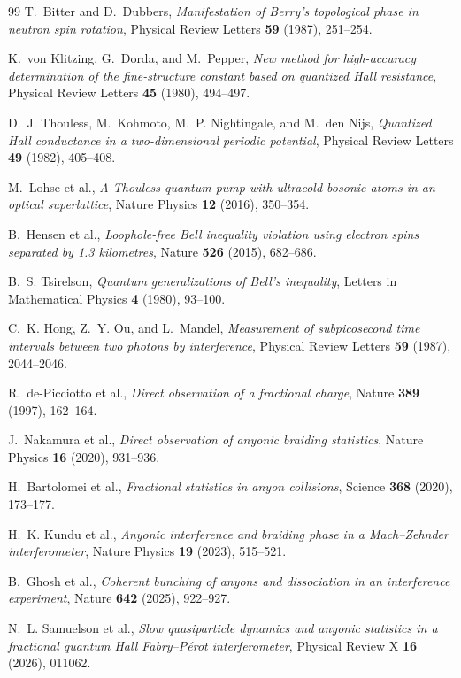 \begin{thebibliography}{99}
T.~Bitter and D.~Dubbers,
\emph{Manifestation of Berry's topological phase in neutron spin rotation},
Physical Review Letters \textbf{59} (1987), 251--254.

K.~von Klitzing, G.~Dorda, and M.~Pepper,
\emph{New method for high-accuracy determination of the fine-structure
constant based on quantized Hall resistance},
Physical Review Letters \textbf{45} (1980), 494--497.

D.~J. Thouless, M.~Kohmoto, M.~P. Nightingale, and M.~den Nijs,
\emph{Quantized Hall conductance in a two-dimensional periodic potential},
Physical Review Letters \textbf{49} (1982), 405--408.

M.~Lohse et al.,
\emph{A Thouless quantum pump with ultracold bosonic atoms in an optical
superlattice},
Nature Physics \textbf{12} (2016), 350--354.

B.~Hensen et al.,
\emph{Loophole-free Bell inequality violation using electron spins separated
by 1.3 kilometres},
Nature \textbf{526} (2015), 682--686.

B.~S. Tsirelson,
\emph{Quantum generalizations of Bell's inequality},
Letters in Mathematical Physics \textbf{4} (1980), 93--100.

C.~K. Hong, Z.~Y. Ou, and L.~Mandel,
\emph{Measurement of subpicosecond time intervals between two photons by
interference},
Physical Review Letters \textbf{59} (1987), 2044--2046.

R.~de-Picciotto et al.,
\emph{Direct observation of a fractional charge},
Nature \textbf{389} (1997), 162--164.

J.~Nakamura et al.,
\emph{Direct observation of anyonic braiding statistics},
Nature Physics \textbf{16} (2020), 931--936.

H.~Bartolomei et al.,
\emph{Fractional statistics in anyon collisions},
Science \textbf{368} (2020), 173--177.

H.~K. Kundu et al.,
\emph{Anyonic interference and braiding phase in a Mach--Zehnder
interferometer},
Nature Physics \textbf{19} (2023), 515--521.

B.~Ghosh et al.,
\emph{Coherent bunching of anyons and dissociation in an interference
experiment},
Nature \textbf{642} (2025), 922--927.

N.~L. Samuelson et al.,
\emph{Slow quasiparticle dynamics and anyonic statistics in a fractional
quantum Hall Fabry--P{\'e}rot interferometer},
Physical Review X \textbf{16} (2026), 011062.


\end{thebibliography}
